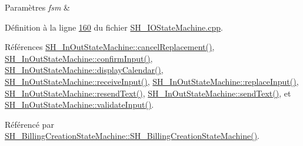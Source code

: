 \begin{DoxyParams}{Paramètres}
{\em fsm} & \\
\hline
\end{DoxyParams}


Définition à la ligne \hyperlink{SH__IOStateMachine_8cpp_source_l00160}{160} du fichier \hyperlink{SH__IOStateMachine_8cpp_source}{S\-H\-\_\-\-I\-O\-State\-Machine.\-cpp}.



Références \hyperlink{classSH__InOutStateMachine_a035d37535533d4805fe2606f38c19380}{S\-H\-\_\-\-In\-Out\-State\-Machine\-::cancel\-Replacement()}, \hyperlink{classSH__InOutStateMachine_a7f7d9c9300c1d05bce2c26029f28cc31}{S\-H\-\_\-\-In\-Out\-State\-Machine\-::confirm\-Input()}, \hyperlink{classSH__InOutStateMachine_ab3a12d1f9b658d8ffdc17669a6c065f2}{S\-H\-\_\-\-In\-Out\-State\-Machine\-::display\-Calendar()}, \hyperlink{classSH__InOutStateMachine_a037ed5e13ecfae2123a8d4940292e410}{S\-H\-\_\-\-In\-Out\-State\-Machine\-::receive\-Input()}, \hyperlink{classSH__InOutStateMachine_a9fa5db44086de2576c812f631aa4f60a}{S\-H\-\_\-\-In\-Out\-State\-Machine\-::replace\-Input()}, \hyperlink{classSH__InOutStateMachine_a526822c66b46aa0cd81ba4473fa5573f}{S\-H\-\_\-\-In\-Out\-State\-Machine\-::resend\-Text()}, \hyperlink{classSH__InOutStateMachine_a5e7f5958bae31696b6a8deab94ad2b4f}{S\-H\-\_\-\-In\-Out\-State\-Machine\-::send\-Text()}, et \hyperlink{classSH__InOutStateMachine_aec1b3fef3c1f82499aa1f73beaecd08a}{S\-H\-\_\-\-In\-Out\-State\-Machine\-::validate\-Input()}.



Référencé par \hyperlink{classSH__BillingCreationStateMachine_ad62b77fa4aeafe200056ff3974562f83}{S\-H\-\_\-\-Billing\-Creation\-State\-Machine\-::\-S\-H\-\_\-\-Billing\-Creation\-State\-Machine()}.


